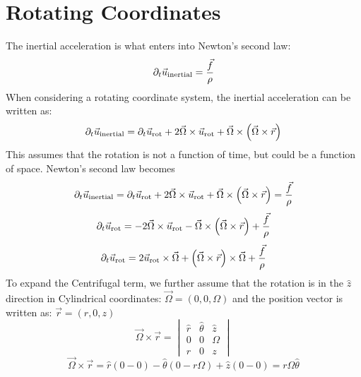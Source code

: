 \documentclass[apj,onecolumn]{emulateapj}
\newcommand{\uvec}{\ensuremath{\vec{u}}} %
\begin{document}
\section{Rotating Coordinates}
\label{sec:rotate}
The inertial acceleration is what enters into Newton's second law:
\begin{equation}
\ptl_t\uvec_{\mathrm{inertial}} = \frac{\vec{f}}{\rho}
\end{equation}
When considering a rotating coordinate system, the inertial acceleration can be
written as:
\begin{equation}
\ptl_t\uvec_{\mathrm{inertial}} = \ptl_t\uvec_{\mathrm{rot}} +
                      2\vec{\Omega}\times\uvec_{\mathrm{rot}} +
                       \vec{\Omega}\times\left(\vec{\Omega}\times\vec{r}\right)
\end{equation}
This assumes that the rotation is not a function of time, but could be a 
function of space. Newton's second law becomes
\begin{equation}
\ptl_t\uvec_{\mathrm{inertial}} = \ptl_t\uvec_{\mathrm{rot}} +
                      2\vec{\Omega}\times\uvec_{\mathrm{rot}} +
                       \vec{\Omega}\times\left(\vec{\Omega}\times\vec{r}\right)
                      = \frac{\vec{f}}{\rho}
\end{equation}
\begin{equation}
\ptl_t\uvec_{\mathrm{rot}} = - 2\vec{\Omega}\times\uvec_{\mathrm{rot}} -
                      \vec{\Omega}\times\left(\vec{\Omega}\times\vec{r}\right)
                      + \frac{\vec{f}}{\rho}
\end{equation}
\begin{equation}
\ptl_t\uvec_{\mathrm{rot}} = 2\uvec_{\mathrm{rot}}\times\vec{\Omega} +
                      \left(\vec{\Omega}\times\vec{r}\right)\times\vec{\Omega}
                      + \frac{\vec{f}}{\rho}
\end{equation}
To expand the Centrifugal term, we further assume that the rotation is in the 
$\hat{z}$ direction in Cylindrical coordinates: $\vec{\Omega} = (0,0,\Omega)$ 
and the position vector is written as: $\vec{r} = (r, 0, z)$
\begin{equation}
\vec{\Omega}\times\vec{r} =
\begin{vmatrix*}
 \hat{r} & \hat{\theta} & \hat{z} \\
    0    & 0 & \Omega \\
    r    & 0 & z
\end{vmatrix*}
\end{equation}
\begin{equation}
\vec{\Omega}\times\vec{r} = \hat{r}\left(0-0\right)
                          - \hat{\theta}\left(0-r\Omega\right)
                          + \hat{z}\left(0-0\right) 
                          = r\Omega\hat{\theta}
\end{equation}
\end{document}
